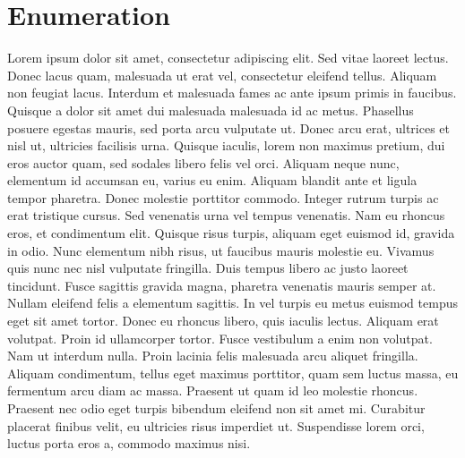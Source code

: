 \section*{Enumeration}
Lorem ipsum dolor sit amet, consectetur adipiscing elit. Sed vitae laoreet lectus. Donec lacus quam, malesuada ut erat vel, consectetur eleifend tellus. Aliquam non feugiat lacus. Interdum et malesuada fames ac ante ipsum primis in faucibus. Quisque a dolor sit amet dui malesuada malesuada id ac metus. Phasellus posuere egestas mauris, sed porta arcu vulputate ut. Donec arcu erat, ultrices et nisl ut, ultricies facilisis urna. Quisque iaculis, lorem non maximus pretium, dui eros auctor quam, sed sodales libero felis vel orci. Aliquam neque nunc, elementum id accumsan eu, varius eu enim. Aliquam blandit ante et ligula tempor pharetra. Donec molestie porttitor commodo. Integer rutrum turpis ac erat tristique cursus. Sed venenatis urna vel tempus venenatis. Nam eu rhoncus eros, et condimentum elit. Quisque risus turpis, aliquam eget euismod id, gravida in odio. Nunc elementum nibh risus, ut faucibus mauris molestie eu.
 Vivamus quis nunc nec nisl vulputate fringilla. Duis tempus libero ac justo laoreet tincidunt. Fusce sagittis gravida magna, pharetra venenatis mauris semper at. Nullam eleifend felis a elementum sagittis. In vel turpis eu metus euismod tempus eget sit amet tortor. Donec eu rhoncus libero, quis iaculis lectus. Aliquam erat volutpat. Proin id ullamcorper tortor. Fusce vestibulum a enim non volutpat. Nam ut interdum nulla. Proin lacinia felis malesuada arcu aliquet fringilla. Aliquam condimentum, tellus eget maximus porttitor, quam sem luctus massa, eu fermentum arcu diam ac massa. Praesent ut quam id leo molestie rhoncus. Praesent nec odio eget turpis bibendum eleifend non sit amet mi. Curabitur placerat finibus velit, eu ultricies risus imperdiet ut. Suspendisse lorem orci, luctus porta eros a, commodo maximus nisi.

